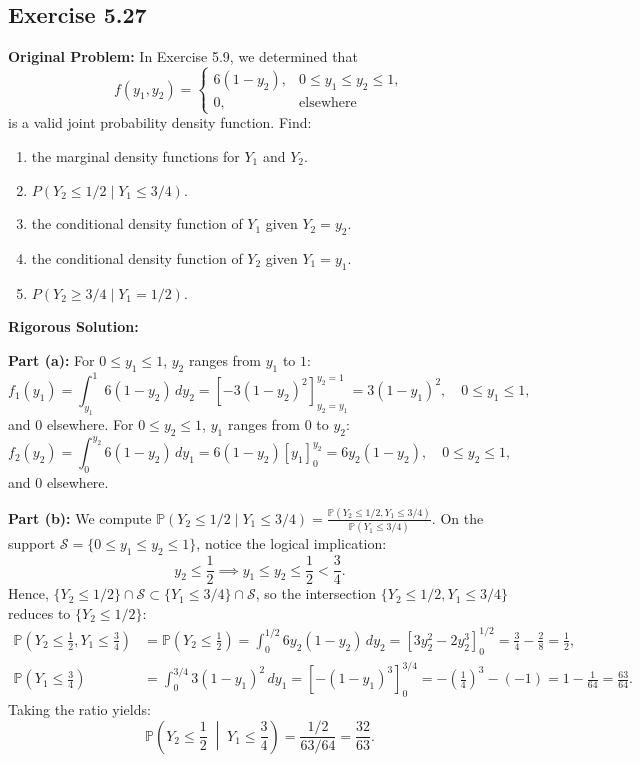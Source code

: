 \documentclass[11pt, letterpaper]{article}
\theoremstyle{definition}
\theoremstyle{remark}
\newcommand{\Prob}{\mathbb{P}}
\begin{document}
\subsection{Exercise 5.27}

\textbf{Original Problem:}
In Exercise 5.9, we determined that
\[ f(y_1, y_2) = \begin{cases} 6(1 - y_2), & 0 \le y_1 \le y_2 \le 1, \\ 0, & \text{elsewhere} \end{cases} \]
is a valid joint probability density function. Find:
\begin{enumerate}[label=\textbf{\alph*}]
    \item the marginal density functions for $Y_1$ and $Y_2$.
    \item $P(Y_2 \le 1/2 \mid Y_1 \le 3/4)$.
    \item the conditional density function of $Y_1$ given $Y_2 = y_2$.
    \item the conditional density function of $Y_2$ given $Y_1 = y_1$.
    \item $P(Y_2 \ge 3/4 \mid Y_1 = 1/2)$.
\end{enumerate}

\textbf{Rigorous Solution:}

\textbf{Part (a):} For $0 \le y_1 \le 1$, $y_2$ ranges from $y_1$ to $1$:
\[ f_1(y_1) = \int_{y_1}^1 6(1 - y_2) \, dy_2 = \left[ -3(1 - y_2)^2 \right]_{y_2=y_1}^{y_2=1} = 3(1 - y_1)^2, \quad 0 \le y_1 \le 1, \]
and $0$ elsewhere. For $0 \le y_2 \le 1$, $y_1$ ranges from $0$ to $y_2$:
\[ f_2(y_2) = \int_0^{y_2} 6(1 - y_2) \, dy_1 = 6(1 - y_2) \left[ y_1 \right]_0^{y_2} = 6y_2(1 - y_2), \quad 0 \le y_2 \le 1, \]
and $0$ elsewhere.

\textbf{Part (b):} We compute $\Prob(Y_2 \le 1/2 \mid Y_1 \le 3/4) = \frac{\Prob(Y_2 \le 1/2, Y_1 \le 3/4)}{\Prob(Y_1 \le 3/4)}$.
On the support $\mathcal{S} = \{0 \le y_1 \le y_2 \le 1\}$, notice the logical implication:
\[ y_2 \le \frac{1}{2} \implies y_1 \le y_2 \le \frac{1}{2} < \frac{3}{4}. \]
Hence, $\{Y_2 \le 1/2\} \cap \mathcal{S} \subset \{Y_1 \le 3/4\} \cap \mathcal{S}$, so the intersection $\{Y_2 \le 1/2, Y_1 \le 3/4\}$ reduces to $\{Y_2 \le 1/2\}$:
\begin{align*}
    \Prob\left(Y_2 \le \frac{1}{2}, Y_1 \le \frac{3}{4}\right) &= \Prob\left(Y_2 \le \frac{1}{2}\right) = \int_0^{1/2} 6y_2(1 - y_2) \, dy_2 = \left[ 3y_2^2 - 2y_2^3 \right]_0^{1/2} = \frac{3}{4} - \frac{2}{8} = \frac{1}{2}, \\
    \Prob\left(Y_1 \le \frac{3}{4}\right) &= \int_0^{3/4} 3(1 - y_1)^2 \, dy_1 = \left[ -(1 - y_1)^3 \right]_0^{3/4} = -\left(\frac{1}{4}\right)^3 - (-1) = 1 - \frac{1}{64} = \frac{63}{64}.
\end{align*}
Taking the ratio yields:
\[ \Prob\left(Y_2 \le \frac{1}{2} \;\middle|\; Y_1 \le \frac{3}{4}\right) = \frac{1/2}{63/64} = \frac{32}{63}. \]
\end{document}
